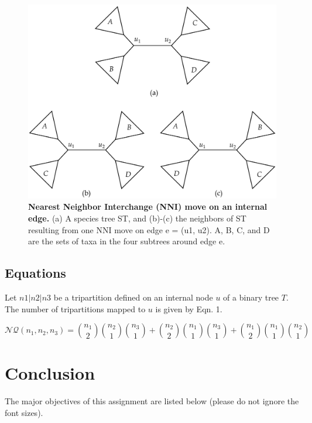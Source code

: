\documentclass[18pt, a4paper]{extarticle} %
\begin{document}
	 
	 \begin{figure}[h!]
	 	\centering
	 	\includegraphics[scale=0.3]{Figure3.pdf}
	 	\caption{\textbf{Nearest Neighbor Interchange (NNI) move on an internal edge.} (a)
	 		A species tree ST, and (b)-(c) the neighbors of ST resulting from one NNI move on edge
	 		e = (u1, u2). A, B, C, and D are the sets of taxa in the four subtrees around edge e.}
	 \end{figure}
 
 	\subsection{Equations}
 	Let $n1|n2|n3$ be a tripartition defined on an internal node $u$ of a binary tree $T$. The number of tripartitions mapped to $u$ is given by Eqn. 1.
	 
	\begin{equation}
		\mathcal{N}\mathcal{Q} (n_1,n_2,n_3)=\binom{n_1}{2}\binom{n_2}{1}\binom{n_3}{1}+\binom{n_2}{2}\binom{n_1}{1}\binom{n_3}{1}+\binom{n_1}{2}\binom{n_1}{1}\binom{n_2}{1}
	\end{equation}

	\section{Conclusion}
	The major objectives of this assignment are listed below (please do not ignore the font sizes).
	
\end{document}
